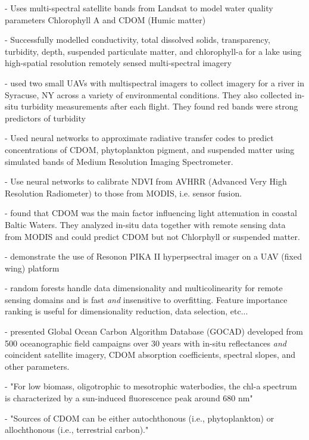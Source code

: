 \documentclass[journal,article,submit,pdftex,moreauthors]{Definitions/mdpi}
\begin{document}
- \cite{brezonik2005landsat} Uses multi-spectral satellite bands from Landsat to model water quality parameters Chlorophyll A and CDOM (Humic matter)


- \cite{sagan2020monitoring} Successfully modelled conductivity, total dissolved solids, transparency, turbidity, depth, suspended particulate matter, and chlorophyll-a for a lake using high-spatial resolution remotely sensed multi-spectral imagery


- \cite{ehmann2019monitoring} used two small UAVs with multispectral imagers to collect imagery for a river in Syracuse, NY across a variety of environmental conditions. They also collected in-situ turbidity measurements after each flight. They found red bands were strong predictors of turbidity

- \cite{schiller1999neural} Used neural networks to approximate radiative transfer codes to predict concentrations of CDOM, phytoplankton pigment, and suspended matter using simulated bands of Medium Resolution Imaging Spectrometer.

- \cite{brown2008neural} Use neural networks to calibrate NDVI from AVHRR (Advanced Very High Resolution Radiometer) to those from MODIS, i.e. sensor fusion.

- \cite{paavel2011optical} found that CDOM was the main factor influencing light attenuation in coastal Baltic Waters. They analyzed in-situ data together with remote sensing data from MODIS and could predict CDOM but not Chlorphyll or suspended matter.

- \cite{hruska2012radiometric} demonstrate the use of Resonon PIKA II hyperpsectral imager on a UAV (fixed wing) platform

- \cite{belgiu2016random} random forests handle data dimensionality and multicolinearity for remote sensing domains and is fast \textit{and} insensitive to overfitting. Feature importance ranking is useful for dimensionality reduction, data selection, etc... 


- \cite{aurin2018remote}  presented Global Ocean Carbon Algorithm Database (GOCAD) developed from 500 oceanographic field campaigns over 30 years with in-situ reflectances \textit{and} coincident satellite imagery, CDOM absorption coefficients, spectral slopes, and other parameters.

- \cite{topp2020research} "For low biomass, oligotrophic to mesotrophic waterbodies, the chl-a spectrum is characterized by a sun-induced fluorescence peak around 680 nm"

- \cite{topp2020research} "Sources of CDOM can be either autochthonous (i.e., phytoplankton) or allochthonous (i.e., terrestrial carbon)."
\end{document}
